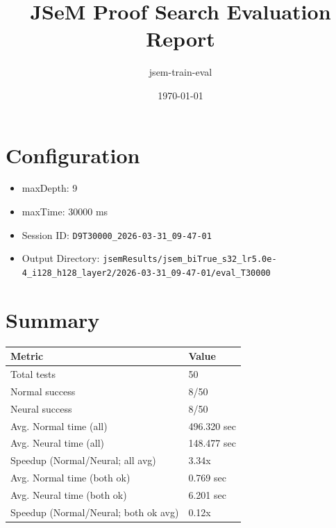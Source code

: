 \documentclass[a4paper,10pt]{article}
\title{JSeM Proof Search Evaluation Report}
\author{jsem-train-eval}
\date{\today}
\begin{document}
\maketitle

\section{Configuration}
\begin{itemize}
\item maxDepth: 9
\item maxTime: 30000 ms
\item Session ID: \texttt{D9T30000\_2026-03-31\_09-47-01}
\item Output Directory: \texttt{jsemResults/jsem\_biTrue\_s32\_lr5.0e-4\_i128\_h128\_layer2/2026-03-31\_09-47-01/eval\_T30000}
\end{itemize}

\section{Summary}
\begin{tabular}{ll}
\toprule
\textbf{Metric} & \textbf{Value} \\
\midrule
Total tests & 50 \\
Normal success & 8/50 \\
Neural success & 8/50 \\
\midrule
Avg. Normal time (all) & 496.320 sec \\
Avg. Neural time (all) & 148.477 sec \\
Speedup (Normal/Neural; all avg) & 3.34x \\
Avg. Normal time (both ok) & 0.769 sec \\
Avg. Neural time (both ok) & 6.201 sec \\
Speedup (Normal/Neural; both ok avg) & 0.12x \\
\bottomrule
\end{tabular}
\end{document}

